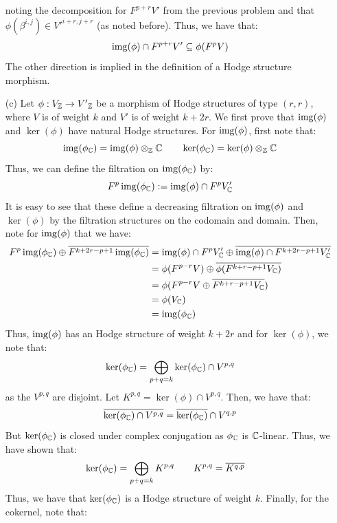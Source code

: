 \documentclass[12pt]{article}
\begin{document}
\begin{solution}
\begin{enumerate}
        noting the decomposition for $F^{p+r} V'$ from the previous problem and that $\phi(\beta^{i,j}) \in {V'}^{i+r, j+r}$ (as noted before). Thus, we have that:
        \[ \img(\phi) \cap F^{p+r}V' \subseteq \phi(F^{p}V) \]
        The other direction is implied in the definition of a Hodge structure morphism. 
        \item[(c)] Let $\phi: V_\mathbb Z \to {V'}_\mathbb Z$ be a morphism of Hodge structures of type $(r, r)$, where $V$ is of weight $k$ and $V'$ is of weight $k+2r$. We first prove that $\operatorname{img}(\phi)$ and $\ker(\phi)$ have natural Hodge structures. \bbni
        For $\operatorname{img}(\phi)$, first note that:
        \[ \operatorname{img}(\phi_\mathbb C) = \operatorname{img}(\phi) \otimes_\mathbb Z \mathbb C \qquad \ker(\phi_\mathbb C) = \ker(\phi) \otimes_\mathbb Z \mathbb C \]
        Thus, we can define the filtration on $\operatorname{img}(\phi_\mathbb C)$ by: 
        \[ F^p \operatorname{img}(\phi_\mathbb C) := \operatorname{img}(\phi) \cap F^{p} V'_\mathbb C \]    
        It is easy to see that these define a decreasing filtration on $\operatorname{img}(\phi)$ and $\ker(\phi)$ by the filtration structures on the codomain and domain. Then, note for $\operatorname{img}(\phi)$ that we have: 
        \begin{align*}
            F^{p} \operatorname{img}(\phi_\mathbb C) \oplus \overline{F^{k+2r-p+1} \operatorname{img}(\phi_\mathbb C)} 
            &= \operatorname{img}(\phi) \cap F^{p} V'_\mathbb C \oplus \overline{\operatorname{img}(\phi) \cap F^{k+2r-p+1} V'_\mathbb C} \\
            &= \phi(F^{p-r} V) \oplus \overline{\phi(F^{k+r-p+1} V_\mathbb C)} \\
            &= \phi(F^{p-r} V \oplus \overline{F^{k+r-p+1} V_\mathbb C}) \\
            &= \phi(V_\mathbb C) \\
            &= \operatorname{img}(\phi_\mathbb C)
        \end{align*}    
        Thus, $\operatorname{img}(\phi)$ has an Hodge structure of weight $k+2r$ and for $\ker(\phi)$, we note that:
        \[ \ker(\phi_\mathbb C) = \bigoplus_{p+q = k} \ker(\phi_\mathbb C) \cap V^{p,q}\]
        as the $V^{p, q}$ are disjoint. Let $K^{p, q} = \ker(\phi) \cap V^{p,q}$. Then, we have that: 
        \[ \overline{\ker(\phi_\mathbb C) \cap V^{p, q}} = \overline{\ker(\phi_\mathbb C)} \cap V^{q, p}\]
        But $\ker(\phi_\mathbb C)$ is closed under complex conjugation as $\phi_\mathbb C$ is $\mathbb C$-linear. Thus, we have shown that:
        \begin{align*}
            \ker(\phi_\mathbb C) &= \bigoplus_{p+q = k} K^{p, q}  \qquad K^{p, q} = \overline{K^{q, p}}
        \end{align*}
        Thus, we have that $\ker(\phi_\mathbb C)$ is a Hodge structure of weight $k$. \bbni
        Finally, for the cokernel, note that:
        \begin{align*}

\end{align*}
\end{enumerate}
\end{solution}
\end{document}
